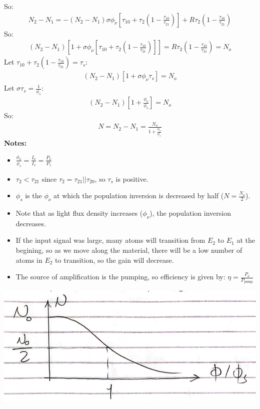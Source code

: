 \documentclass[11pt]{article}
\begin{document}
So:
\begin{align*}
    N_2 - N_1 = -(N_2 - N_1) \sigma \phi_{\nu} \left[ \tau_{10} + \tau_2 \left( 1- \frac{\tau_{10}}{\tau_{21}} \right) \right] + R \tau_2 \left( 1- \frac{\tau_{10}}{\tau_{21}} \right)
\end{align*}
So:
\begin{align*}
    (N_2 - N_1) \left[ 1 + \sigma \phi_{\nu} \left[ \tau_{10} + \tau_2 \left( 1- \frac{\tau_{10}}{\tau_{21}} \right) \right] \right] = R \tau_2 \left( 1- \frac{\tau_{10}}{\tau_{21}} \right) = N_o
\end{align*}
Let $\tau_{10} + \tau_2 \left( 1- \frac{\tau_{10}}{\tau_{21}} \right) = \tau_s$:
\begin{align*}
    (N_2 - N_1) \left[ 1 + \sigma \phi_{\nu} \tau_s \right] = N_o
\end{align*}
Let $\sigma \tau_s = \frac{1}{\phi_s}$:
\begin{align*}
    (N_2 - N_1) \left[ 1 + \frac{\phi_{\nu}}{\phi_s} \right] = N_o
\end{align*}
So:
\begin{align*}
    N =  N_2 - N_1 = \frac{N_o}{1 + \frac{\phi_{\nu}}{\phi_s}}
\end{align*}
\textbf{Notes:}
\begin{itemize}
    \item $\frac{\phi_{\nu}}{\phi_s} = \frac{I_{\nu}}{I_s} = \frac{P_{\nu}}{P_s}$
    \item $\tau_2 < \tau_{21}$ since $\tau_2 = \tau_{21} || \tau_{20}$, so $\tau_s$ is positive.
    \item $\phi_s$ is the $\phi_{\nu}$ at which the population inversion is decreased by half ($N=\frac{N_o}{2}$).
    \item Note that as light flux density increases ($\phi_{\nu}$), the population inversion decreases.
    \item If the input signal was large, many atoms will transition from $E_2$ to $E_1$ at the begining, so as we move along the material, there will be a low number of atoms in $E_2$ to transition, so the gain will decrease.
    \item The source of amplification is the pumping, so efficiency is given by: $\eta = \frac{P_{\nu}}{P_{\text{pump}}}$
\end{itemize}
\begin{center}
    \includegraphics[scale=0.6]{4.png}
\end{center}
\end{document}

